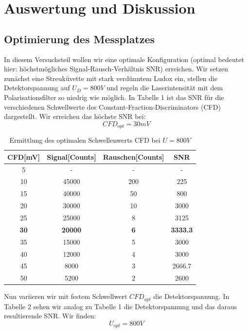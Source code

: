 \documentclass{article}
\begin{document}
\section{Auswertung und Diskussion}
\subsection{Optimierung des Messplatzes}
In diesem Versuchsteil wollen wir eine optimale Konfiguration (optimal bedeutet hier: höchstmögliches
Signal-Rausch-Verhältnis SNR) erreichen. Wir setzen zunächst eine Streuküvette mit stark verdünntem
Ludox ein, stellen die Detektorspannung auf $U_D=800V$ und regeln die Laserintensität mit dem Polarisationsfilter so niedrig
wie möglich. In Tabelle 1 ist das SNR für die verschiedenen Schwellwerte des Constant-Fraction-Discriminators (CFD) dargestellt.
Wir erreichen das höchste SNR bei: $$CFD_{opt}=30mV$$

\begin{table}[h]
  \centering
  \begin{tabular}{c|c|c|c}
    CFD[mV] & Signal[Counts] & Rauschen[Counts] & SNR \\
    \hline
    5       &     -          & -                & -\\
    10      & 45000          & 200              & 225\\
    15      & 40000          & 50               & 800\\
    20      & 30000          & 10               & 3000\\
    25      & 25000          & 8                & 3125\\
    \textbf{30}      & \textbf{20000}          & \textbf{6}                & \textbf{3333.3}\\
    35      & 15000          & 5                & 3000\\
    40      & 12000          & 4                & 3000\\
    45      & 8000           & 3                & 2666.7\\
    50      & 5200           & 2                & 2600\\
  \end{tabular}
  \caption{Ermittlung des optimalen Schwellenwerts CFD bei $U=800V$}
\end{table}

Nun variieren wir mit festem Schwellwert $CFD_{opt}$ die Detektorspannung. In Tabelle 2 sehen wir analog zu
Tabelle 1 die Detektorspannung und das daraus resultierende SNR. Wir finden: $$ U_{opt}=800V$$
 
\end{document}
